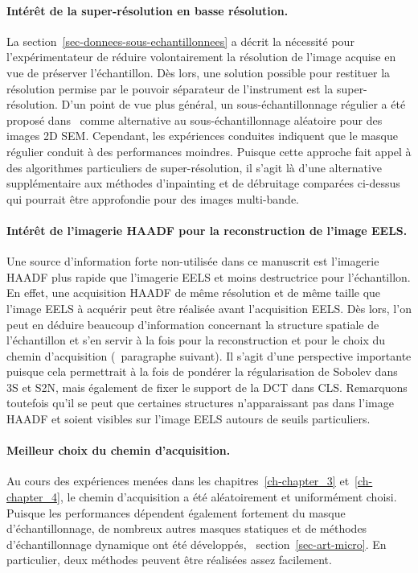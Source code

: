 \paragraph{Intérêt de la super-résolution en basse résolution.} La section~\ref{sec-donnees-sous-echantillonnees} a décrit la nécessité pour l'expérimentateur de réduire volontairement la résolution de l'image acquise en vue de préserver l'échantillon. Dès lors, une solution possible pour restituer la résolution permise par le pouvoir séparateur de l'instrument est la super-résolution. D'un point de vue plus général, un sous-échantillonnage régulier a été proposé dans~\cite{trampert2018ultramicroscopy} comme alternative au sous-échantillonnage aléatoire pour des images 2D SEM. Cependant, les expériences conduites indiquent que le masque régulier conduit à des performances moindres. Puisque cette approche fait appel à des algorithmes particuliers de super-résolution, il s'agit là d'une alternative supplémentaire aux méthodes d'inpainting et de débruitage comparées ci-dessus qui pourrait être approfondie pour des images multi-bande. 

\paragraph{Intérêt de l'imagerie HAADF pour la reconstruction de l'image EELS.} Une source d'information forte non-utilisée dans ce manuscrit est l'imagerie HAADF plus rapide que l'imagerie EELS et moins destructrice pour l'échantillon. En effet, une acquisition HAADF de même résolution et de même taille que l'image EELS à acquérir peut être réalisée avant l'acquisition EELS. Dès lors, l'on peut en déduire beaucoup d'information concernant la structure spatiale de l'échantillon et s'en servir à la fois pour la reconstruction et pour le choix du chemin d'acquisition (\cf\ paragraphe suivant). Il s'agit d'une perspective importante puisque cela permettrait à la fois de pondérer la régularisation de Sobolev dans 3S et S2N, mais également de fixer le support de la DCT dans CLS. Remarquons toutefois qu'il se peut que certaines structures n'apparaissant pas dans l'image HAADF et soient visibles sur l'image EELS autours de seuils particuliers.

\paragraph{Meilleur choix du chemin d'acquisition.} Au cours des expériences menées dans les chapitres~\ref{ch-chapter_3} et~\ref{ch-chapter_4}, le chemin d'acquisition a été aléatoirement et uniformément choisi. Puisque les performances dépendent également fortement du masque d'échantillonnage, de nombreux autres masques statiques et de méthodes d'échantillonnage dynamique ont été développés, \cf\ section~\ref{sec-art-micro}. En particulier, deux méthodes peuvent être réalisées assez facilement.

